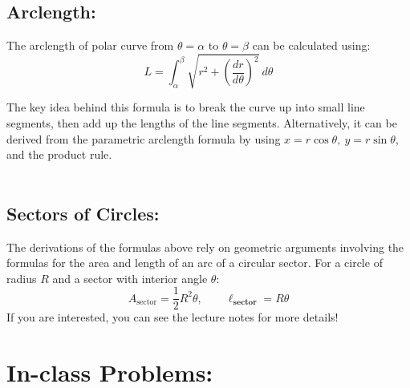 \subsection*{Arclength:}

The arclength of polar curve from \(\theta = \alpha\) to \(\theta = \beta\) can be calculated using:
\[
 L= \int_{\alpha}^{\beta} \sqrt{r^2 + \left(\frac{dr}{d\theta}\right)^2}\ d\theta
\]

The key idea behind this formula is to break the curve up into small line segments, then add up the lengths of the line segments. Alternatively, it can be derived from the parametric arclength formula by using \(x = r\cos\theta,\  y = r\sin\theta\), and the product rule.\\~\\

\subsection*{Sectors of Circles:}

The derivations of the formulas above rely on geometric arguments involving the formulas for the area and length of an arc of a circular sector. For a circle of radius \(R\) and a sector with interior angle \(\theta\): 
\[
A_{\text{sector}} = \frac{1}{2}R^2\theta, \qquad \ell_{\textbf{sector}} = R\theta
\]
If you are interested, you can see the lecture notes for more details!\\




\section*{In-class Problems:}

